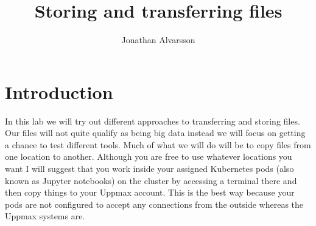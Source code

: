 \documentclass[watermark]{pbpreprint}
\begin{document}
\title{Storing and transferring files}
\newcommand{\subtitle}{Big Data in Life Science}
\renewcommand{\maketitlehookb}{\centering\textsc{\subtitle}}
\author{Jonathan Alvarsson}
\maketitle
\begin{KeepFromToc}
   \tableofcontents
\end{KeepFromToc}


\section{Introduction}
In this lab we will try out different approaches to transferring and storing
files. Our files will not quite qualify as being big data instead we will focus
on getting a chance to test different tools. Much of what we will do will be to
copy files from one location to another. Although you are free to use whatever
locations you want I will suggest that you work inside your assigned Kubernetes
pods (also known as Jupyter notebooks) on the cluster by accessing a terminal
there and then copy things to your Uppmax account. This is the best way because
your pods are not configured to accept any connections from the outside whereas
the Uppmax systems are.
\end{document}
